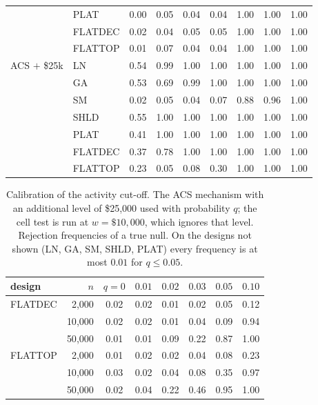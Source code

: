 \begin{table}[h]
\begin{tabular}{llrcccccc}
 & PLAT & 0.00 & 0.05 & 0.04 & 0.04 & 1.00 & 1.00 & 1.00\\
 & FLATDEC & 0.02 & 0.04 & 0.05 & 0.05 & 1.00 & 1.00 & 1.00\\
 & FLATTOP & 0.01 & 0.07 & 0.04 & 0.04 & 1.00 & 1.00 & 1.00\\
\addlinespace
ACS $+$ \$25k & LN & 0.54 & 0.99 & 1.00 & 1.00 & 1.00 & 1.00 & 1.00\\
 & GA & 0.53 & 0.69 & 0.99 & 1.00 & 1.00 & 1.00 & 1.00\\
 & SM & 0.02 & 0.05 & 0.04 & 0.07 & 0.88 & 0.96 & 1.00\\
 & SHLD & 0.55 & 1.00 & 1.00 & 1.00 & 1.00 & 1.00 & 1.00\\
 & PLAT & 0.41 & 1.00 & 1.00 & 1.00 & 1.00 & 1.00 & 1.00\\
 & FLATDEC & 0.37 & 0.78 & 1.00 & 1.00 & 1.00 & 1.00 & 1.00\\
 & FLATTOP & 0.23 & 0.05 & 0.08 & 0.30 & 1.00 & 1.00 & 1.00\\
\bottomrule
\end{tabular}
\end{table}

\begin{table}[h]
\centering\small
\caption{Calibration of the activity cut-off. The ACS mechanism with an additional level of \$25{,}000 used with probability $q$; the cell test is run at $w=\$10{,}000$, which ignores that level. Rejection frequencies of a true null. On the designs not shown (LN, GA, SM, SHLD, PLAT) every frequency is at most $0.01$ for $q\le0.05$.}\label{tab:S-delta}
\begin{tabular}{lrcccccc}
\toprule
design & $n$ & $q=0$ & $0.01$ & $0.02$ & $0.03$ & $0.05$ & $0.10$\\
\midrule
FLATDEC & 2{,}000 & 0.02 & 0.02 & 0.01 & 0.02 & 0.05 & 0.12\\
 & 10{,}000 & 0.02 & 0.02 & 0.01 & 0.04 & 0.09 & 0.94\\
 & 50{,}000 & 0.01 & 0.01 & 0.09 & 0.22 & 0.87 & 1.00\\
FLATTOP & 2{,}000 & 0.01 & 0.02 & 0.02 & 0.04 & 0.08 & 0.23\\
 & 10{,}000 & 0.03 & 0.02 & 0.04 & 0.08 & 0.35 & 0.97\\
 & 50{,}000 & 0.02 & 0.04 & 0.22 & 0.46 & 0.95 & 1.00\\
\bottomrule
\end{tabular}
\end{table}

